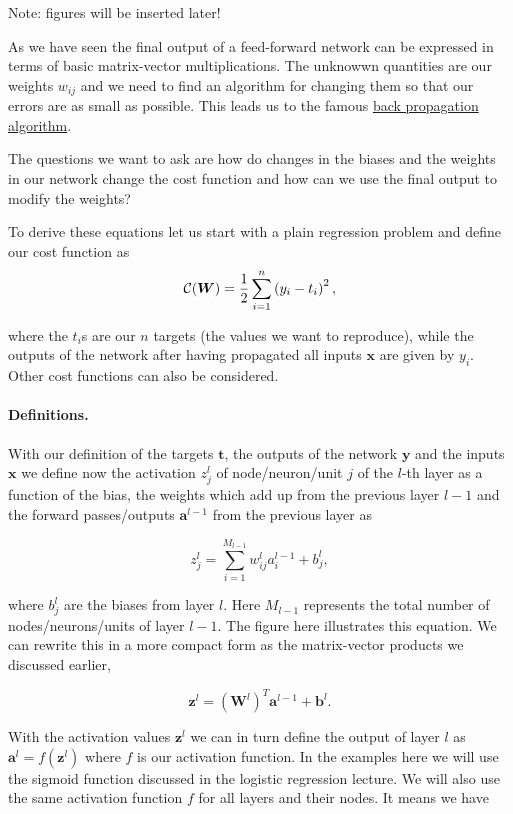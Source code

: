 \documentclass[%
oneside,                 %
final,                   %
10pt]{article}
\begin{document}
Note: figures will be inserted later!

As we have seen the final output of a feed-forward network can be expressed in terms of basic matrix-vector multiplications.
The unknowwn quantities are our weights $w_{ij}$ and we need to find an algorithm for changing them so that our errors are as small as possible.
This leads us to the famous \href{{https://www.nature.com/articles/323533a0}}{back propagation algorithm}.

The questions we want to ask are how do changes in the biases and the
weights in our network change the cost function and how can we use the
final output to modify the weights?

To derive these equations let us start with a plain regression problem
and define our cost function as
\[
{\cal C}(\boldsymbol{W})  =  \frac{1}{2}\sum_{i=1}^n\left(y_i - t_i\right)^2, 
\]

where the $t_i$s are our $n$ targets (the values we want to
reproduce), while the outputs of the network after having propagated
all inputs $\boldsymbol{x}$ are given by $y_i$.  Other cost functions can also be considered.

\paragraph{Definitions.}
With our definition of the targets $\boldsymbol{t}$, the outputs of the
network $\boldsymbol{y}$ and the inputs $\boldsymbol{x}$ we
define now the activation $z_j^l$ of node/neuron/unit $j$ of the
$l$-th layer as a function of the bias, the weights which add up from
the previous layer $l-1$ and the forward passes/outputs
$\boldsymbol{a}^{l-1}$ from the previous layer as


\[
z_j^l = \sum_{i=1}^{M_{l-1}}w_{ij}^la_i^{l-1}+b_j^l,
\]

where $b_j^l$ are the biases from layer $l$.  Here $M_{l-1}$
represents the total number of nodes/neurons/units of layer $l-1$. The
figure here illustrates this equation.  We can rewrite this in a more
compact form as the matrix-vector products we discussed earlier,

\[
\boldsymbol{z}^l = \left(\boldsymbol{W}^l\right)^T\boldsymbol{a}^{l-1}+\boldsymbol{b}^l.
\]

With the activation values $\boldsymbol{z}^l$ we can in turn define the
output of layer $l$ as $\boldsymbol{a}^l = f(\boldsymbol{z}^l)$ where $f$ is our
activation function. In the examples here we will use the sigmoid
function discussed in the logistic regression lecture. We will also use the same activation function $f$ for all layers
and their nodes.  It means we have
\end{document}
